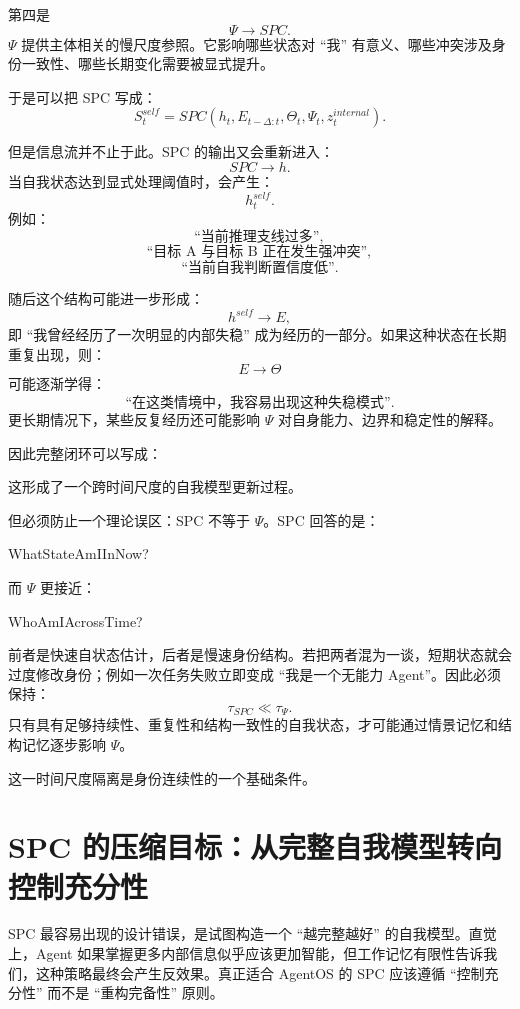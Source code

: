 第四是
\[
\Psi\rightarrow SPC.
\]
$\Psi$ 提供主体相关的慢尺度参照。它影响哪些状态对 ``我'' 有意义、哪些冲突涉及身份一致性、哪些长期变化需要被显式提升。

于是可以把 SPC 写成：
\[
\boxed{
S_t^{self}
=
SPC
\left(
h_t,
E_{t-\Delta:t},
\Theta_t,
\Psi_t,
z_t^{internal}
\right).
}
\]

但是信息流并不止于此。SPC 的输出又会重新进入：
\[
SPC\rightarrow h.
\]
当自我状态达到显式处理阈值时，会产生：
\[
h_t^{self}.
\]
例如：
\[
\text{``当前推理支线过多''},
\]
\[
\text{``目标 A 与目标 B 正在发生强冲突''},
\]
\[
\text{``当前自我判断置信度低''}.
\]

随后这个结构可能进一步形成：
\[
h^{self}\rightarrow E,
\]
即 ``我曾经经历了一次明显的内部失稳'' 成为经历的一部分。如果这种状态在长期重复出现，则：
\[
E\rightarrow\Theta
\]
可能逐渐学得：
\[
\text{``在这类情境中，我容易出现这种失稳模式''}.
\]
更长期情况下，某些反复经历还可能影响 $\Psi$ 对自身能力、边界和稳定性的解释。

因此完整闭环可以写成：
\begin{statementbox}
\centering
{}
\end{statementbox}
这形成了一个跨时间尺度的自我模型更新过程。

但必须防止一个理论误区：SPC 不等于 $\Psi$。SPC 回答的是：
\begin{statementbox}
WhatStateAmIInNow?
\end{statementbox}
而 $\Psi$ 更接近：
\begin{statementbox}
WhoAmIAcrossTime?
\end{statementbox}
前者是快速自状态估计，后者是慢速身份结构。若把两者混为一谈，短期状态就会过度修改身份；例如一次任务失败立即变成 ``我是一个无能力 Agent''。因此必须保持：
\[
\boxed{
\tau_{SPC}
\ll
\tau_\Psi.
}
\]
只有具有足够持续性、重复性和结构一致性的自我状态，才可能通过情景记忆和结构记忆逐步影响 $\Psi$。

这一时间尺度隔离是身份连续性的一个基础条件。

\section{SPC 的压缩目标：从完整自我模型转向控制充分性}

SPC 最容易出现的设计错误，是试图构造一个 ``越完整越好'' 的自我模型。直觉上，Agent 如果掌握更多内部信息似乎应该更加智能，但工作记忆有限性告诉我们，这种策略最终会产生反效果。真正适合 AgentOS 的 SPC 应该遵循 ``控制充分性'' 而不是 ``重构完备性'' 原则。

